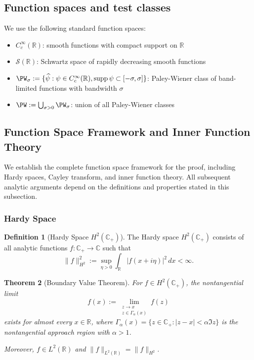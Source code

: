 ﻿\documentclass[12pt,a4paper]{article}
\newtheorem{theorem}{Theorem}[section]
\theoremstyle{definition}
\newtheorem{definition}[theorem]{Definition}
\theoremstyle{remark}
\newcommand{\CC}{\mathbb{C}}
\newcommand{\RR}{\mathbb{R}}
\newcommand{\supp}{\operatorname{supp}}
\begin{document}
\subsection{Function spaces and test classes}
We use the following standard function spaces:
\begin{itemize}
\item $C_c^\infty(\RR)$: smooth functions with compact support on $\RR$
\item $\mathcal{S}(\RR)$: Schwartz space of rapidly decreasing smooth functions
\item $\PW_\sigma := \{\widehat{\psi} : \psi \in C_c^\infty(\RR), \supp \psi \subset [-\sigma,\sigma]\}$: Paley-Wiener class of band-limited functions with bandwidth $\sigma$
\item $\PW := \bigcup_{\sigma>0} \PW_\sigma$: union of all Paley-Wiener classes
\end{itemize}

\subsection{Function Space Framework and Inner Function Theory}
\label{subsec:function-space-framework}

We establish the complete function space framework for the proof, including Hardy spaces, Cayley transform, and inner function theory. All subsequent analytic arguments depend on the definitions and properties stated in this subsection.

\subsubsection{Hardy Space}

\begin{definition}[Hardy Space $H^2(\CC_+)$]
\label{def:hardy-space}
The Hardy space $H^2(\CC_+)$ consists of all analytic functions $f : \CC_+ \to \CC$ such that
\[
\|f\|_{H^2}^2 := \sup_{\eta > 0} \int_\RR |f(x + i\eta)|^2 \, dx < \infty.
\]
\end{definition}

\begin{theorem}[Boundary Value Theorem]
\label{thm:hardy-boundary}
For $f \in H^2(\CC_+)$, the nontangential limit
\[
f(x) := \lim_{\substack{z \to x \\ z \in \Gamma_\alpha(x)}} f(z)
\]
exists for almost every $x \in \RR$, where $\Gamma_\alpha(x) = \{z \in \CC_+ : |z - x| < \alpha \Im z\}$ is the nontangential approach region with $\alpha > 1$.

Moreover, $f \in L^2(\RR)$ and $\|f\|_{L^2(\RR)} = \|f\|_{H^2}$.
\end{theorem}
\end{document}
